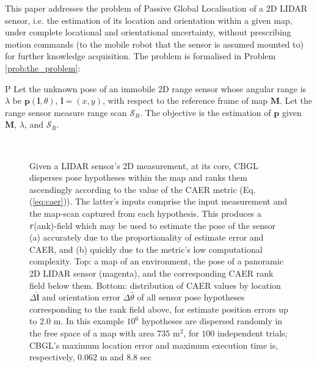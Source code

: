 This paper addresses the problem of Passive Global Localisation of a 2D LIDAR
sensor, i.e. the estimation of its location and orientation within a given map,
under complete locational and orientational uncertainty, without prescribing
motion commands (to the mobile robot that the sensor is assumed mounted to) for
further knowledge acquisition. The problem is formalised in Problem
\ref{prob:the_problem}:

\begin{customprb}{P}
  \label{prob:the_problem}
  Let the unknown pose of an immobile 2D range sensor whose angular range is
  $\lambda$ be $\bm{p}(\bm{l},\theta)$, $\bm{l} = (x,y)$, with respect to the
  reference frame of map $\bm{M}$. Let the range sensor measure range scan
  $\mathcal{S}_R$. The objective is the estimation of $\bm{p}$ given $\bm{M}$,
  $\lambda$, and $\mathcal{S}_R$.
\end{customprb}

\begin{figure}\vspace{0.4em}
  \subfloat{    \label{fig:a}} \vspace{-1.7cm}\\
  \subfloat{\hspace{-0.3cm} \label{fig:b}}
  \caption{\small
           Given a LIDAR sensor's 2D measurement, at its core, CBGL disperses
           pose hypotheses within the map and ranks them ascendingly according
           to the value of the CAER metric (Eq. (\ref{eq:caer})). The latter's
           inputs comprise the input measurement and the map-scan captured from
           each hypothesis. This produces a \texttt{r}(ank)-field which may be
           used to estimate the pose of the sensor (a) accurately due to the
           proportionality of estimate error and CAER, and (b) quickly due to
           the metric's low computational complexity.  Top: a map of an
           environment, the pose of a panoramic 2D LIDAR sensor (magenta), and
           the corresponding CAER rank field below them. Bottom: distribution
           of CAER values by location $\Delta \hat{\bm{l}}$ and orientation
           error $\Delta \hat{\theta}$ of all sensor pose hypotheses
           corresponding to the rank field above, for estimate position errors
           up to $2.0$ m. In this example $10^6$ hypotheses are dispersed
           randomly in the free space of a map with area $735$ m$^2$, for $100$
           independent trials; CBGL's maximum location error and maximum
           execution time is, respectively, $0.062$ m and $8.8$ sec }
  \vspace{-0.75cm}
  \label{fig:face}
\end{figure}

